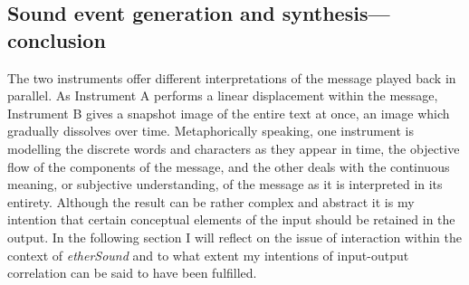 \subsection{Sound event generation and synthesis---conclusion} The two instruments offer different interpretations of the message played back in parallel. As Instrument A performs a linear displacement within the message, Instrument B gives a snapshot image of the entire text at once, an image which gradually dissolves over time. Metaphorically speaking, one instrument is modelling the discrete words and characters as they appear in time, the objective flow of the components of the message, and the other deals with the continuous meaning, or subjective understanding, of the message as it is interpreted in its entirety. Although the result can be rather complex and abstract it is my intention that certain conceptual elements of the input should be retained in the output. In the following section I will reflect on the issue of interaction within the context of \emph{etherSound} and to what extent my intentions of input-output correlation can be said to have been fulfilled. 

